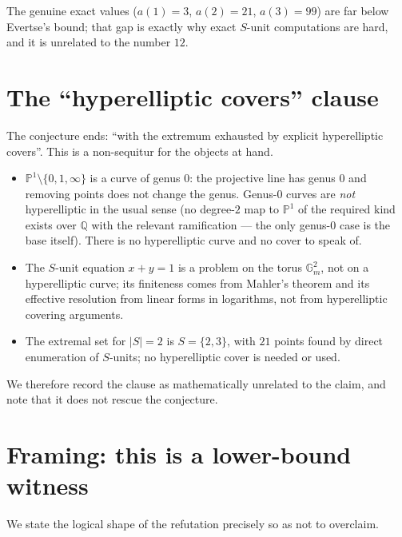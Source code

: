 \documentclass[11pt]{article}
\theoremstyle{definition}
\theoremstyle{remark}
\newcommand{\Q}{\mathbb{Q}}
\newcommand{\PP}{\mathbb{P}}
\begin{document}
The genuine exact values ($a(1)=3$, $a(2)=21$, $a(3)=99$) are far below
Evertse's bound; that gap is exactly why exact $S$-unit computations are hard,
and it is unrelated to the number $12$.

\section{The ``hyperelliptic covers'' clause}

The conjecture ends: ``with the extremum exhausted by explicit hyperelliptic
covers''. This is a non-sequitur for the objects at hand.

\begin{itemize}
\item $\PP^1\setminus\{0,1,\infty\}$ is a curve of genus $0$: the projective
  line has genus $0$ and removing points does not change the genus. Genus-$0$
  curves are \emph{not} hyperelliptic in the usual sense (no degree-$2$ map to
  $\PP^1$ of the required kind exists over $\Q$ with the relevant ramification
  — the only genus-$0$ case is the base itself). There is no hyperelliptic
  curve and no cover to speak of.
\item The $S$-unit equation $x+y=1$ is a problem on the torus
  $\mathbb{G}_m^2$, not on a hyperelliptic curve; its finiteness comes from
  Mahler's theorem and its effective resolution from linear forms in
  logarithms, not from hyperelliptic covering arguments.
\item The extremal set for $|S|=2$ is $S=\{2,3\}$, with $21$ points found by
  direct enumeration of $S$-units; no hyperelliptic cover is needed or used.
\end{itemize}

We therefore record the clause as mathematically unrelated to the claim, and
note that it does not rescue the conjecture.

\section{Framing: this is a lower-bound witness}\label{sec:framing}

We state the logical shape of the refutation precisely so as not to
overclaim.
\end{document}
